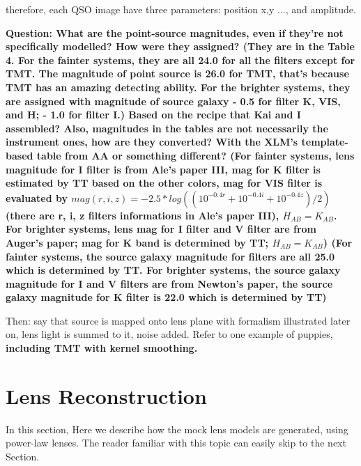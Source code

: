 \documentclass[a4paper,11pt]{article}
\begin{document}
therefore, each QSO image have three parameters: position x,y ..., and amplitude. 
 
\textbf{{Question}: What are the point-source magnitudes, even if they're not specifically modelled? How were they assigned? (They are in the Table 4. For the fainter systems, they are all 24.0 for all the filters except for TMT. The magnitude of point source is 26.0 for TMT, that's because TMT has an amazing detecting ability. For the brighter systems, they are assigned with magnitude of source galaxy - 0.5 for filter K, VIS, and H; - 1.0 for filter I.)
 Based on the recipe that Kai and I assembled? Also, magnitudes in the tables are not necessarily the instrument ones, how are they converted? With the XLM's template-based table from AA or something different? (For fainter systems, lens magnitude for I filter is from Ale's paper III, mag for K filter is estimated by TT based on the other colors, mag for VIS filter is evaluated by $mag(r,i,z)=-2.5*log((10^{-0.4r}+10^{-0.4i}+10^{-0.4z})/2)$ (there are r, i, z filters informations in Ale's paper III), $H_{AB}=K_{AB}$. For brighter systems, lens mag for I filter and V filter are from Auger's paper; mag for K band is determined by TT;  $H_{AB}=K_{AB}$) (For fainter systems, the source galaxy magnitude for filters are all 25.0 which is determined by TT. For brighter systems, the source galaxy magnitude for I and V filters are from Newton's paper, the source galaxy magnitude for K filter is 22.0 which is determined by TT)}

Then: say that source is mapped onto lens plane with formalism illustrated later on, lens light is summed to it, noise added. Refer to one example of puppies, \textbf{including TMT with kernel smoothing.}

\section{Lens Reconstruction}
In this section, 
Here we describe how the mock lens models are generated, using power-law lenses. The reader familiar with this topic can easily skip to the next Section.
\end{document}
